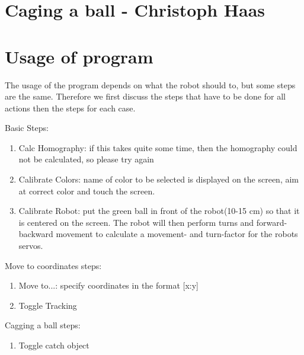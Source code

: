 \documentclass[703031]{iisreport}
\begin{document}
\section{Caging a ball - Christoph Haas}

\section{Usage of program}
The usage of the program depends on what the robot should to, but some steps are the same. Therefore we first discuss the steps that have to be done for all actions then the steps for each case.

Basic Steps:
	\begin{enumerate}
		\item Calc Homography: if this takes quite some time, then the homography could not be calculated, so please try again
		\item Calibrate Colors: name of color to be selected is displayed on the screen, aim at correct color and touch the screen.
		\item Calibrate Robot: put the green ball in front of the robot(10-15 cm) so that it is centered on the screen. The robot will then perform turns and forward-backward movement to calculate a movement- and turn-factor for the robots servos.
	\end{enumerate}
	
Move to coordinates steps:
	\begin{enumerate}
		\item Move to...: specify coordinates in the format [x:y]
		\item Toggle Tracking
	\end{enumerate}

Cagging a ball steps:
	\begin{enumerate}
		\item Toggle catch object
	\end{enumerate}
\end{document}
